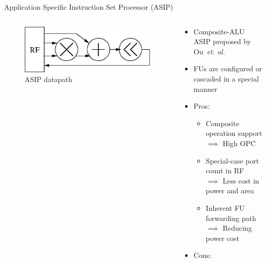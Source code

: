 \documentclass{beamer}
\begin{document}
\begin{CJK}{UTF8}{bkai}
            \begin{frame}{Application Specific Instruction Set Processor (ASIP)}
                \begin{columns}
                    \begin{column}{0.45\textwidth}
                        \begin{figure}[!ht]
                            \centering
                            \includegraphics[width=0.9\linewidth]{./figs/cascade.eps}
                            \caption{ASIP datapath}
                        \end{figure}
                    \end{column}
                    \begin{column}{0.55\textwidth}
                        \begin{itemize}
                            \item <2-> {Composite-ALU ASIP proposed by Ou~\textit{et. al.}\footnotemark}
                            \item <3-> {FUs are configured or cascaded in a special manner}
                            \item <4-> {Pros:
                                \begin{itemize}
                                    \item Composite operation support \\ $\implies$ High OPC
                                    \item Special-case port count in RF \\ $\implies$ Less cost in power and area
                                    \item Inherent FU forwarding path \\ $\implies$ Reducing power cost
                                \end{itemize}
                                }
                            \item <5-> {Cons:
                                \begin{itemize}

\end{itemize}}
\end{itemize}
\end{column}
\end{columns}
\end{frame}
\end{CJK}
\end{document}
